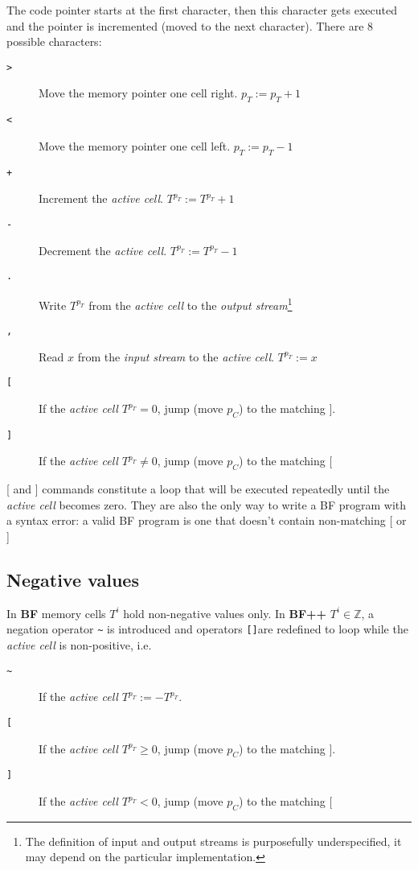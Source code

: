 The code pointer starts at the first character, then this character gets executed and the pointer is incremented (moved to the next character).
There are 8 possible characters:

\begin{description}
\item[\texttt{>}] Move the memory pointer one cell right. $p_T := p_T + 1$
\item[\texttt{<}] Move the memory pointer one cell left. $p_T := p_T - 1$
\item[\texttt{+}] Increment the \textit{active cell}. $T^{p_T} := T^{p_T} + 1$
\item[\texttt{-}] Decrement the \textit{active cell}. $T^{p_T} := T^{p_T} - 1$
\item[\texttt{.}] Write $T^{p_T}$ from the \textit{active cell} to the \textit{output stream}\footnote{The definition of input and output streams is purposefully underspecified, it may depend on the particular implementation.}
\item[\texttt{,}] Read $x$ from the \textit{input stream} to the \textit{active cell}. $T^{p_T} := x$
\item[ \texttt{[} ] If the \textit{active cell} $T^{p_T} = 0$, jump (move $p_C$) to the matching $]$.
\item[ \texttt{]} ] If the \textit{active cell} $T^{p_T} \neq 0$, jump (move $p_C$) to the matching $[$
\end{description}

[ and ] commands constitute a loop that will be executed repeatedly until the \textit{active cell} becomes zero.
They are also the only way to write a BF program with a syntax error: a valid BF program is one that doesn't contain non-matching [ or ]


\subsection{Negative values}

In \textbf{BF} memory cells $T^i$ hold non-negative values only.
In \textbf{BF++} $T^i \in \mathbb{Z}$, a negation operator \texttt{\~} is introduced and operators \texttt{[]}are redefined to loop while the \textit{active cell} is non-positive, i.e.

\begin{description}
\item[ \texttt{\~} ] If the \textit{active cell} $T^{p_T} := - T^{p_T}$.
\item[ \texttt{[} ] If the \textit{active cell} $T^{p_T} \geq 0$, jump (move $p_C$) to the matching $]$.
\item[ \texttt{]} ] If the \textit{active cell} $T^{p_T} < 0$, jump (move $p_C$) to the matching $[$
\end{description}

